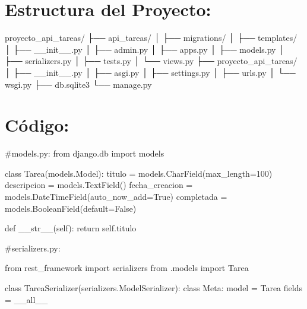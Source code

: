 \documentclass[
  a4paper,
  onepage,
  openany]{scrreprt}
\newenvironment{Shaded}{\begin{snugshade}}{\end{snugshade}}
\newcommand{\CommentTok}[1]{\textcolor[rgb]{0.37,0.37,0.37}{#1}}
\newcommand{\ControlFlowTok}[1]{\textcolor[rgb]{0.00,0.23,0.31}{#1}}
\newcommand{\DecValTok}[1]{\textcolor[rgb]{0.68,0.00,0.00}{#1}}
\newcommand{\FunctionTok}[1]{\textcolor[rgb]{0.28,0.35,0.67}{#1}}
\newcommand{\ImportTok}[1]{\textcolor[rgb]{0.00,0.46,0.62}{#1}}
\newcommand{\KeywordTok}[1]{\textcolor[rgb]{0.00,0.23,0.31}{#1}}
\newcommand{\NormalTok}[1]{\textcolor[rgb]{0.00,0.23,0.31}{#1}}
\newcommand{\OperatorTok}[1]{\textcolor[rgb]{0.37,0.37,0.37}{#1}}
\newcommand{\StringTok}[1]{\textcolor[rgb]{0.13,0.47,0.30}{#1}}
\newcommand{\VariableTok}[1]{\textcolor[rgb]{0.07,0.07,0.07}{#1}}
\begin{document}
\hypertarget{estructura-del-proyecto}{%
\section{Estructura del Proyecto:}\label{estructura-del-proyecto}}

\begin{Shaded}
\begin{Highlighting}[]
\NormalTok{proyecto\_api\_tareas/}
\NormalTok{├── api\_tareas/}
\NormalTok{│   ├── migrations/}
\NormalTok{│   ├── templates/}
\NormalTok{│   ├── \_\_init\_\_.py}
\NormalTok{│   ├── admin.py}
\NormalTok{│   ├── apps.py}
\NormalTok{│   ├── models.py}
\NormalTok{│   ├── serializers.py}
\NormalTok{│   ├── tests.py}
\NormalTok{│   └── views.py}
\NormalTok{├── proyecto\_api\_tareas/}
\NormalTok{│   ├── \_\_init\_\_.py}
\NormalTok{│   ├── asgi.py}
\NormalTok{│   ├── settings.py}
\NormalTok{│   ├── urls.py}
\NormalTok{│   └── wsgi.py}
\NormalTok{├── db.sqlite3}
\NormalTok{└── manage.py}
\end{Highlighting}
\end{Shaded}

\hypertarget{cuxf3digo}{%
\section{Código:}\label{cuxf3digo}}

\begin{Shaded}
\begin{Highlighting}[]
\CommentTok{\#models.py:}
\ImportTok{from}\NormalTok{ django.db }\ImportTok{import}\NormalTok{ models}

\KeywordTok{class}\NormalTok{ Tarea(models.Model):}
\NormalTok{    titulo }\OperatorTok{=}\NormalTok{ models.CharField(max\_length}\OperatorTok{=}\DecValTok{100}\NormalTok{)}
\NormalTok{    descripcion }\OperatorTok{=}\NormalTok{ models.TextField()}
\NormalTok{    fecha\_creacion }\OperatorTok{=}\NormalTok{ models.DateTimeField(auto\_now\_add}\OperatorTok{=}\VariableTok{True}\NormalTok{)}
\NormalTok{    completada }\OperatorTok{=}\NormalTok{ models.BooleanField(default}\OperatorTok{=}\VariableTok{False}\NormalTok{)}

    \KeywordTok{def} \FunctionTok{\_\_str\_\_}\NormalTok{(}\VariableTok{self}\NormalTok{):}
        \ControlFlowTok{return} \VariableTok{self}\NormalTok{.titulo}
\end{Highlighting}
\end{Shaded}

\begin{Shaded}
\begin{Highlighting}[]
\CommentTok{\#serializers.py:}

\ImportTok{from}\NormalTok{ rest\_framework }\ImportTok{import}\NormalTok{ serializers}
\ImportTok{from}\NormalTok{ .models }\ImportTok{import}\NormalTok{ Tarea}

\KeywordTok{class}\NormalTok{ TareaSerializer(serializers.ModelSerializer):}
    \KeywordTok{class}\NormalTok{ Meta:}
\NormalTok{        model }\OperatorTok{=}\NormalTok{ Tarea}
\NormalTok{        fields }\OperatorTok{=} \StringTok{\textquotesingle{}\_\_all\_\_\textquotesingle{}}
\end{Highlighting}
\end{Shaded}
\end{document}
